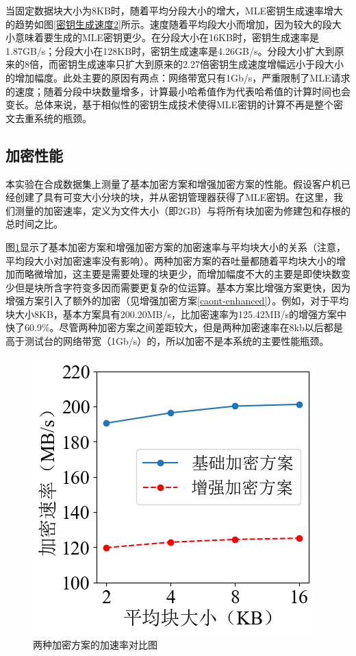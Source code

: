 \documentclass[promaster]{thesis-uestc}
\begin{document}
当固定数据块大小为8KB时，随着平均分段大小的增大，MLE密钥生成速率增大的趋势如图\ref{密钥生成速度2}所示。速度随着平均段大小而增加，因为较大的段大小意味着要生成的MLE密钥更少。在分段大小在16KB时，密钥生成速率是1.87GB/s；分段大小在128KB时，密钥生成速率是4.26GB/s。分段大小扩大到原来的8倍，而密钥生成速率只扩大到原来的2.27倍密钥生成速度增幅远小于段大小的增加幅度。此处主要的原因有两点：网络带宽只有1Gb/s，严重限制了MLE请求的速度；随着分段中块数量增多，计算最小哈希值作为代表哈希值的计算时间也会变长。总体来说，基于相似性的密钥生成技术使得MLE密钥的计算不再是整个密文去重系统的瓶颈。

\subsection{加密性能}\label{加密性能}
本实验在合成数据集上测量了基本加密方案和增强加密方案的性能。假设客户机已经创建了具有可变大小分块的块，并从密钥管理器获得了MLE密钥。在这里，我们测量的加密速率，定义为文件大小（即2GB）与将所有块加密为修建包和存根的总时间之比。

图\ref{两种加密方案的加速率对比图}显示了基本加密方案和增强加密方案的加密速率与平均块大小的关系（注意，平均段大小对加密速率没有影响）。两种加密方案的吞吐量都随着平均块大小的增加而略微增加，这主要是需要处理的块更少，而增加幅度不大的主要是即使块数变少但是块所含字符变多因而需要更复杂的位运算。基本方案比增强方案更快，因为增强方案引入了额外的加密（见增强加密方案\ref{caont-enhanced}）。例如，对于平均块大小8KB，基本方案具有200.20MB/s，比加密速率为125.42MB/s的增强方案中快了60.9\%。尽管两种加密方案之间差距较大，但是两种加密速率在8kb以后都是高于测试台的网络带宽（1Gb/s）的，所以加密不是本系统的主要性能瓶颈。
\begin{figure}[ht]
    \centering
    \includegraphics[width = 0.40\linewidth]{pic/jiamisulv.png}
    \caption{两种加密方案的加速率对比图}
    \label{两种加密方案的加速率对比图}
\end{figure}
\end{document}
